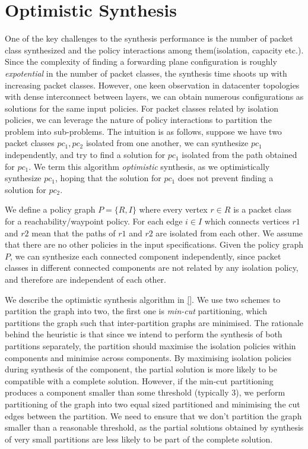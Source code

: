 \section{Optimistic Synthesis} \label{sec:optimistic}
One of the key challenges to the synthesis performance is the number of packet class synthesized and the policy interactions among them(isolation, capacity etc.). Since the complexity of finding a forwarding plane configuration is roughly \emph{expotential} in the number of packet classes, the synthesis time shoots up with increasing packet classes. 
However, one keen observation in datacenter topologies with dense interconnect between layers, we can obtain numerous configurations as solutions for the same input policies. For packet classes related by isolation policies, we can leverage the nature of policy interactions to  partition the problem into sub-problems. 
The intuition is as follows, suppose we have two packet classes $pc_1, pc_2$ isolated from one another, we can synthesize $pc_1$ independently, and try to find a solution for $pc_1$ isolated from the path obtained for $pc_1$. We term this algorithm \emph{optimistic} synthesis, as we optimistically synthesize $pc_1$, hoping that the solution for $pc_1$ does not prevent finding a solution for $pc_2$. 

We define a policy graph $P = \{R, I\}$ where every vertex $r \in R$ is a packet class for a reachability/waypoint policy. For each edge $i \in I$ which connects vertices $r1$ and $r2$ mean that the paths of $r1$ and $r2$ are isolated from each other. We assume that there are no other policies in the input specifications.  
Given the policy graph $P$, we can synthesize each connected component independently, since packet classes in different connected components are not related by any isolation policy, and therefore are independent of each other.  

We describe the optimistic synthesis algorithm in \cref{}. We use two schemes to partition the graph into two, the first one is \emph{min-cut} partitioning, which partitions the graph such that inter-partition graphs are minimised. The rationale behind the heuristic is that since we intend to perform the synthesis of both partitions separately, the partition should maximise the isolation policies within components and minimise across components. By maximising isolation policies during synthesis of the component, the partial solution is more likely to be compatible with a complete solution. However, if the min-cut partitioning produces a component smaller than some threshold (typically 3), we perform partitioning of the graph into two equal sized partitioned and minimising the cut edges between the partition. We need to ensure that we don't partition the graph smaller than a reasonable threshold, as the partial solutions obtained by synthesis of very small partitions are less likely to be part of the complete solution. 

